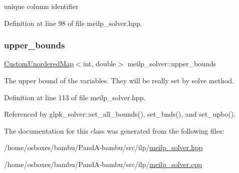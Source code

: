 unique column identifier 



Definition at line 98 of file meilp\+\_\+solver.\+hpp.

\mbox{\label{classmeilp__solver_a4b36c84aa8584c2d66dbfa885fe49214}} 
\subsubsection{\texorpdfstring{upper\+\_\+bounds}{upper\_bounds}}
{\footnotesize\ttfamily \hyperlink{custom__map_8hpp_ad1ed68f2ff093683ab1a33522b144adc}{Custom\+Unordered\+Map}$<$int, double$>$ meilp\+\_\+solver\+::upper\+\_\+bounds\hspace{0.3cm}{\ttfamily [protected]}}



The upper bound of the variables. They will be really set by solve method. 



Definition at line 113 of file meilp\+\_\+solver.\+hpp.



Referenced by glpk\+\_\+solver\+::set\+\_\+all\+\_\+bounds(), set\+\_\+bnds(), and set\+\_\+upbo().



The documentation for this class was generated from the following files\+:\begin{DoxyCompactItemize}
\item 
/home/osboxes/bambu/\+Pand\+A-\/bambu/src/ilp/\hyperlink{meilp__solver_8hpp}{meilp\+\_\+solver.\+hpp}\item 
/home/osboxes/bambu/\+Pand\+A-\/bambu/src/ilp/\hyperlink{meilp__solver_8cpp}{meilp\+\_\+solver.\+cpp}\end{DoxyCompactItemize}
